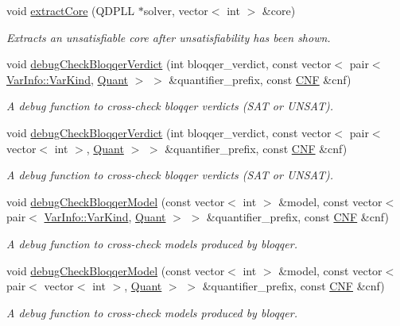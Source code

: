 \begin{DoxyCompactItemize}
void \hyperlink{classDepQBFApiInc_abc030c55a52ca69b8189b14865b26509}{extract\-Core} (Q\-D\-P\-L\-L $\ast$solver, vector$<$ int $>$ \&core)
\begin{DoxyCompactList}\small\item\em Extracts an unsatisfiable core after unsatisfiability has been shown. \end{DoxyCompactList}\item 
void \hyperlink{classDepQBFApiInc_a2488712feac9625909a0cabf9eb09d22}{debug\-Check\-Bloqqer\-Verdict} (int bloqqer\-\_\-verdict, const vector$<$ pair$<$ \hyperlink{classVarInfo_a64d1da76cf84fe674e5fef9764ef11cf}{Var\-Info\-::\-Var\-Kind}, \hyperlink{classQBFSolver_ac091e263cb55286cc07b2451bcf4d3c7}{Quant} $>$ $>$ \&quantifier\-\_\-prefix, const \hyperlink{classCNF}{C\-N\-F} \&cnf)
\begin{DoxyCompactList}\small\item\em A debug function to cross-\/check bloqqer verdicts (S\-A\-T or U\-N\-S\-A\-T). \end{DoxyCompactList}\item 
void \hyperlink{classDepQBFApiInc_a82d045afc3065ae73ee37b61753c1f78}{debug\-Check\-Bloqqer\-Verdict} (int bloqqer\-\_\-verdict, const vector$<$ pair$<$ vector$<$ int $>$, \hyperlink{classQBFSolver_ac091e263cb55286cc07b2451bcf4d3c7}{Quant} $>$ $>$ \&quantifier\-\_\-prefix, const \hyperlink{classCNF}{C\-N\-F} \&cnf)
\begin{DoxyCompactList}\small\item\em A debug function to cross-\/check bloqqer verdicts (S\-A\-T or U\-N\-S\-A\-T). \end{DoxyCompactList}\item 
void \hyperlink{classDepQBFApiInc_a4a43ca2a646a9ca9b13f5328b925be50}{debug\-Check\-Bloqqer\-Model} (const vector$<$ int $>$ \&model, const vector$<$ pair$<$ \hyperlink{classVarInfo_a64d1da76cf84fe674e5fef9764ef11cf}{Var\-Info\-::\-Var\-Kind}, \hyperlink{classQBFSolver_ac091e263cb55286cc07b2451bcf4d3c7}{Quant} $>$ $>$ \&quantifier\-\_\-prefix, const \hyperlink{classCNF}{C\-N\-F} \&cnf)
\begin{DoxyCompactList}\small\item\em A debug function to cross-\/check models produced by bloqqer. \end{DoxyCompactList}\item 
void \hyperlink{classDepQBFApiInc_adf1a4898f0a95bd6784a4f338be9170b}{debug\-Check\-Bloqqer\-Model} (const vector$<$ int $>$ \&model, const vector$<$ pair$<$ vector$<$ int $>$, \hyperlink{classQBFSolver_ac091e263cb55286cc07b2451bcf4d3c7}{Quant} $>$ $>$ \&quantifier\-\_\-prefix, const \hyperlink{classCNF}{C\-N\-F} \&cnf)
\begin{DoxyCompactList}\small\item\em A debug function to cross-\/check models produced by bloqqer. \end{DoxyCompactList}\end{DoxyCompactItemize}
